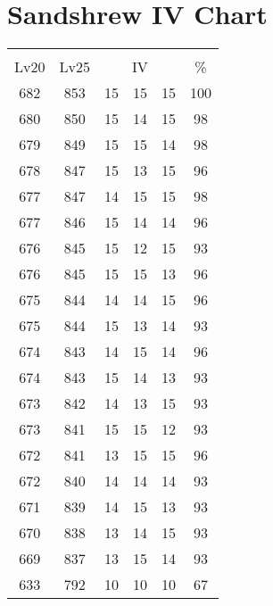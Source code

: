\documentclass{article}%
\begin{document}
%
\normalsize%
\section{Sandshrew IV Chart}%
\label{sec:Sandshrew IV Chart}%
\renewcommand{\arraystretch}{1.5}%
\begin{tabular}{|c|c|c|c|c|c|}%
\hline%
\multicolumn{6}{|c|}{\textcolor{white}{ 
\linebreak{Sandshrew}
}%
\cellcolor{black}}\\%
\multicolumn{1}{|c}{Lv20}&\multicolumn{1}{c|}{Lv25}&\multicolumn{3}{c|}{IV}&\multicolumn{1}{|c|}{\%}\\%
\hline%
\rowcolor{color100}%
682&853&15&15&15&100\\%
\hline%
\rowcolor{color98}%
680&850&15&14&15&98\\%
\hline%
\rowcolor{color98}%
679&849&15&15&14&98\\%
\hline%
\rowcolor{color96}%
678&847&15&13&15&96\\%
\hline%
\rowcolor{color98}%
677&847&14&15&15&98\\%
\hline%
\rowcolor{color96}%
677&846&15&14&14&96\\%
\hline%
\rowcolor{color93}%
676&845&15&12&15&93\\%
\hline%
\rowcolor{color96}%
676&845&15&15&13&96\\%
\hline%
\rowcolor{color96}%
675&844&14&14&15&96\\%
\hline%
\rowcolor{color93}%
675&844&15&13&14&93\\%
\hline%
\rowcolor{color96}%
674&843&14&15&14&96\\%
\hline%
\rowcolor{color93}%
674&843&15&14&13&93\\%
\hline%
\rowcolor{color93}%
673&842&14&13&15&93\\%
\hline%
\rowcolor{color93}%
673&841&15&15&12&93\\%
\hline%
\rowcolor{color96}%
672&841&13&15&15&96\\%
\hline%
\rowcolor{color93}%
672&840&14&14&14&93\\%
\hline%
\rowcolor{color93}%
671&839&14&15&13&93\\%
\hline%
\rowcolor{color93}%
670&838&13&14&15&93\\%
\hline%
\rowcolor{color93}%
669&837&13&15&14&93\\%
\hline%
\rowcolor{color91}%
633&792&10&10&10&67\\%
\end{tabular}

%
\end{document}
